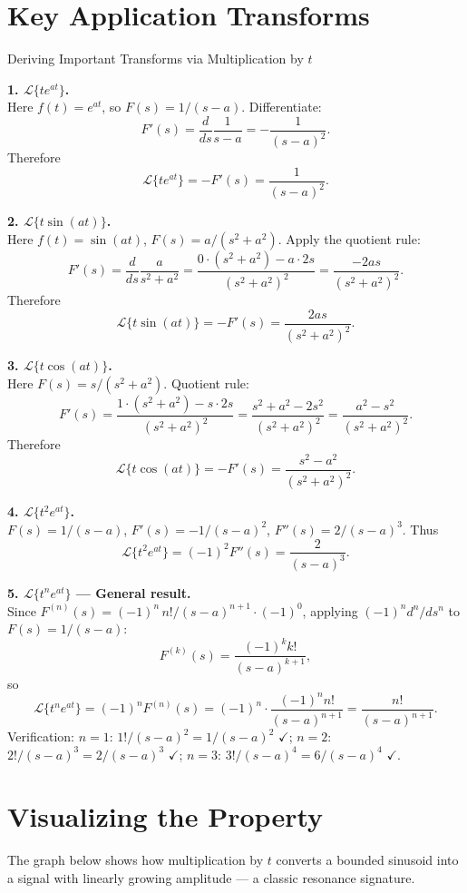 \documentclass[12pt,a4paper]{article}
\begin{document}
\section{Key Application Transforms}
\begin{infobox}{Deriving Important Transforms via Multiplication by $t$}

\textbf{1. $\mathcal{L}\{te^{at}\}$.}\\
Here $f(t)=e^{at}$, so $F(s)=1/(s-a)$. Differentiate:
\[
  F'(s) = \frac{d}{ds}\frac{1}{s-a} = -\frac{1}{(s-a)^2}.
\]
Therefore
\[
  \mathcal{L}\{te^{at}\} = -F'(s) = \frac{1}{(s-a)^2}.
\]

\medskip
\textbf{2. $\mathcal{L}\{t\sin(at)\}$.}\\
Here $f(t)=\sin(at)$, $F(s)=a/(s^2+a^2)$. Apply the quotient rule:
\[
  F'(s) = \frac{d}{ds}\frac{a}{s^2+a^2}
         = \frac{0\cdot(s^2+a^2) - a\cdot 2s}{(s^2+a^2)^2}
         = \frac{-2as}{(s^2+a^2)^2}.
\]
Therefore
\[
  \mathcal{L}\{t\sin(at)\} = -F'(s) = \frac{2as}{(s^2+a^2)^2}.
\]

\medskip
\textbf{3. $\mathcal{L}\{t\cos(at)\}$.}\\
Here $F(s)=s/(s^2+a^2)$. Quotient rule:
\[
  F'(s) = \frac{1\cdot(s^2+a^2) - s\cdot 2s}{(s^2+a^2)^2}
         = \frac{s^2+a^2-2s^2}{(s^2+a^2)^2}
         = \frac{a^2-s^2}{(s^2+a^2)^2}.
\]
Therefore
\[
  \mathcal{L}\{t\cos(at)\} = -F'(s) = \frac{s^2-a^2}{(s^2+a^2)^2}.
\]

\medskip
\textbf{4. $\mathcal{L}\{t^2 e^{at}\}$.}\\
$F(s)=1/(s-a)$, $F'(s)=-1/(s-a)^2$, $F''(s)=2/(s-a)^3$. Thus
\[
  \mathcal{L}\{t^2 e^{at}\} = (-1)^2 F''(s) = \frac{2}{(s-a)^3}.
\]

\medskip
\textbf{5. $\mathcal{L}\{t^n e^{at}\}$ --- General result.}\\
Since $F^{(n)}(s) = (-1)^n \, n!/(s-a)^{n+1} \cdot (-1)^0$, applying
$(-1)^n d^n/ds^n$ to $F(s)=1/(s-a)$:
\[
  F^{(k)}(s) = \frac{(-1)^k k!}{(s-a)^{k+1}},
\]
so
\[
  \mathcal{L}\{t^n e^{at}\} = (-1)^n F^{(n)}(s)
  = (-1)^n \cdot \frac{(-1)^n n!}{(s-a)^{n+1}}
  = \frac{n!}{(s-a)^{n+1}}.
\]
Verification: $n=1$: $1!/(s-a)^2=1/(s-a)^2$ $\checkmark$;
$n=2$: $2!/(s-a)^3=2/(s-a)^3$ $\checkmark$;
$n=3$: $3!/(s-a)^4=6/(s-a)^4$ $\checkmark$.
\end{infobox}

\section{Visualizing the Property}
The graph below shows how multiplication by $t$ converts a bounded sinusoid into
a signal with linearly growing amplitude --- a classic resonance signature.
\end{document}
